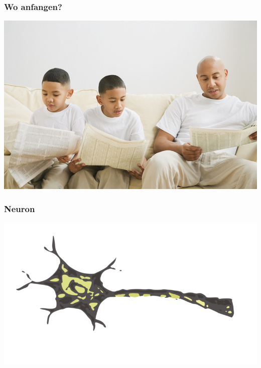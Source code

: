 \documentclass[aspectratio=169,xcolor=dvipsnames]{beamer}
\begin{document}
\begin{frame}
\frametitle{Wo anfangen?}
\begin{center}
\includegraphics[height=0.7\paperheight,keepaspectratio]{images/imitation} 
\end{center}
\end{frame}

\begin{frame}
\frametitle{Neuron}
\begin{center}
\includegraphics[height=0.82\paperheight,keepaspectratio]{images/neuron} 
\end{center}
\end{frame}
\end{document}
